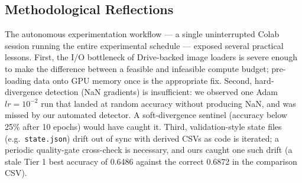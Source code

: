 \documentclass[10pt,letterpaper]{article}
\begin{document}
\subsection{Methodological Reflections}
The autonomous experimentation workflow --- a single uninterrupted Colab session running the entire experimental schedule --- exposed several practical lessons. First, the I/O bottleneck of Drive-backed image loaders is severe enough to make the difference between a feasible and infeasible compute budget; pre-loading data onto GPU memory once is the appropriate fix. Second, hard-divergence detection (NaN gradients) is insufficient: we observed one Adam $lr{=}10^{-2}$ run that landed at random accuracy without producing NaN, and was missed by our automated detector. A soft-divergence sentinel (accuracy below 25\% after 10 epochs) would have caught it. Third, validation-style state files (e.g.\ \texttt{state.json}) drift out of sync with derived CSVs as code is iterated; a periodic quality-gate cross-check is necessary, and ours caught one such drift (a stale Tier 1 best accuracy of 0.6486 against the correct 0.6872 in the comparison CSV).
\end{document}
